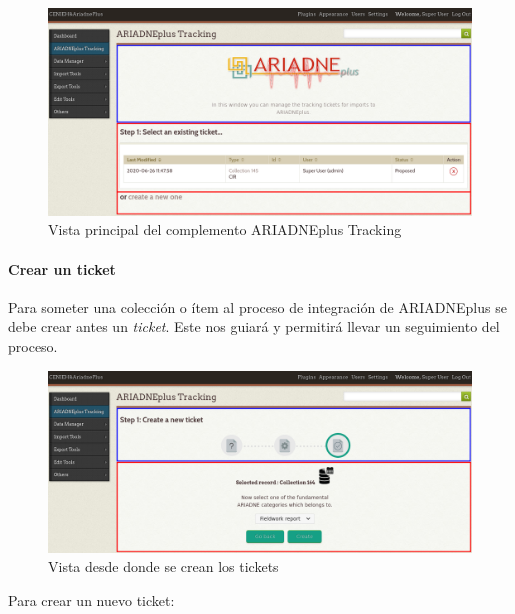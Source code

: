 \documentclass[
]{article}
\begin{document}
\begin{figure}
\hypertarget{ariadne-plus-tracking}{%
\centering
\includegraphics{../_static/images/ariadne-plus-tracking.png}
\caption{Vista principal del complemento ARIADNEplus
Tracking}\label{ariadne-plus-tracking}
}
\end{figure}

\hypertarget{crear-un-ticket}{%
\paragraph{Crear un ticket}\label{crear-un-ticket}}

Para someter una colección o ítem al proceso de integración de
ARIADNEplus se debe crear antes un \emph{ticket}. Este nos guiará y
permitirá llevar un seguimiento del proceso.

\begin{figure}
\hypertarget{ariadne-plus-tracking-new}{%
\centering
\includegraphics{../_static/images/ariadne-plus-tracking-new.png}
\caption{Vista desde donde se crean los
tickets}\label{ariadne-plus-tracking-new}
}
\end{figure}

Para crear un nuevo ticket:
\end{document}
